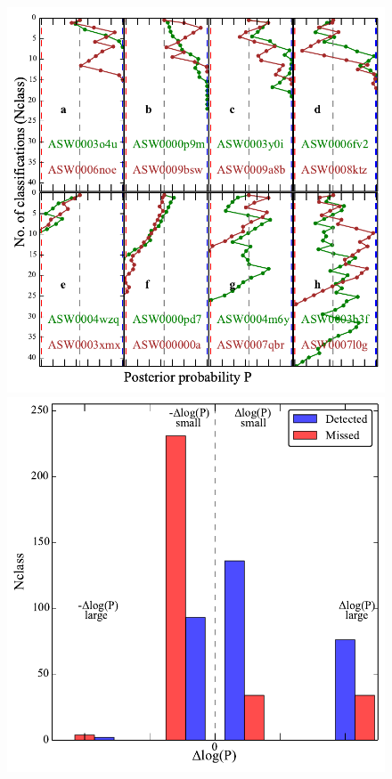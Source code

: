 \documentclass[useAMS,usenatbib,a4paper]{mn2e}
\begin{document}
\begin{figure}
\begin{center}
\includegraphics[scale=0.6]{det_mis_traj.pdf}
\includegraphics[scale=0.6]{det_mis_hist.pdf}

\end{center}
\end{figure}
\end{document}
